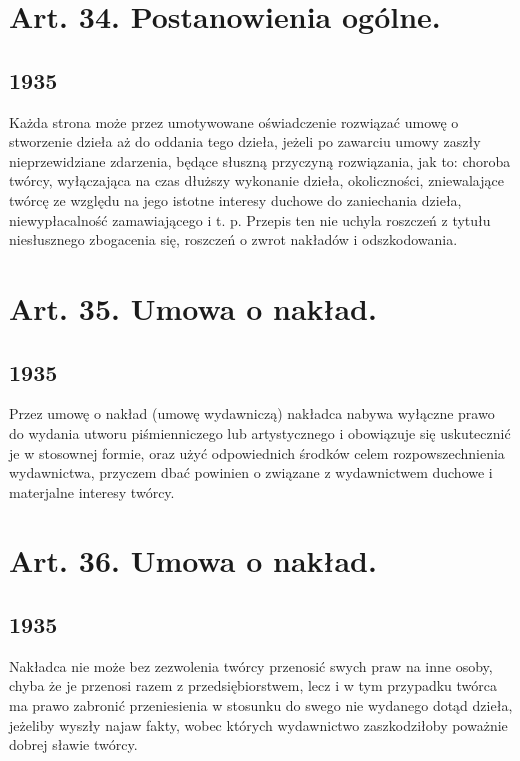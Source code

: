 \documentclass[withmarginpar]{book}
\begin{document}
\section{Art. 34. Postanowienia ogólne.}
\label{sec:art.-34}
\subsection{1935}
\label{sec:art.-34-1}

Każda strona może przez umotywowane oświadczenie rozwiązać umowę o
stworzenie dzieła aż do oddania tego dzieła, jeżeli po zawarciu umowy
zaszły nieprzewidziane zdarzenia, będące słuszną przyczyną
rozwiązania, jak to: choroba twórcy, wyłączająca na czas dłuższy
wykonanie dzieła, okoliczności, zniewalające twórcę ze względu na jego
istotne interesy duchowe do zaniechania dzieła, niewypłacalność
zamawiającego i t. p. Przepis ten nie uchyla roszczeń z tytułu
niesłusznego zbogacenia się, roszczeń o zwrot nakładów i
odszkodowania.

\section{Art. 35. Umowa o nakład.}
\label{sec:art.-35}
\subsection{1935}
\label{sec:art.-35-1}

Przez umowę o nakład (umowę wydawniczą) nakładca nabywa wyłączne prawo
do wydania utworu piśmienniczego lub artystycznego i obowiązuje się
uskutecznić je w stosownej formie, oraz użyć odpowiednich środków
celem rozpowszechnienia wydawnictwa, przyczem dbać powinien o związane
z wydawnictwem duchowe i materjalne interesy twórcy.

\section{Art. 36. Umowa o nakład.}
\label{sec:art.-36}
\subsection{1935}
\label{sec:art.-365-1}

Nakładca nie może bez zezwolenia twórcy przenosić swych praw na inne
osoby, chyba że je przenosi razem z przedsiębiorstwem, lecz i w tym
przypadku twórca ma prawo zabronić przeniesienia w stosunku do swego
nie wydanego dotąd dzieła, jeżeliby wyszły najaw fakty, wobec których
wydawnictwo zaszkodziłoby poważnie dobrej sławie twórcy.
\end{document}
